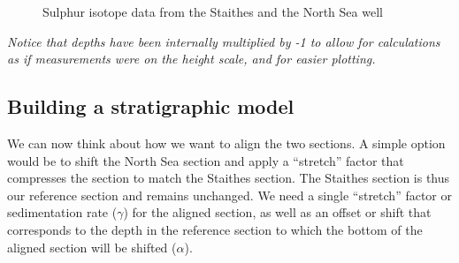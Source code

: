 \documentclass[
  letterpaper,
  DIV=11,
  numbers=noendperiod]{scrartcl}
\begin{document}
\begin{figure}[H]


\caption{\label{fig-5}Sulphur isotope data from the Staithes and the
North Sea well}

\end{figure}%

\emph{Notice that depths have been internally multiplied by -1 to allow
for calculations as if measurements were on the height scale, and for
easier plotting.}

\subsection{Building a stratigraphic
model}\label{building-a-stratigraphic-model}

We can now think about how we want to align the two sections. A simple
option would be to shift the North Sea section and apply a ``stretch''
factor that compresses the section to match the Staithes section. The
Staithes section is thus our reference section and remains unchanged. We
need a single ``stretch'' factor or sedimentation rate (\(\gamma\)) for
the aligned section, as well as an offset or shift that corresponds to
the depth in the reference section to which the bottom of the aligned
section will be shifted (\(\alpha\)).
\end{document}
